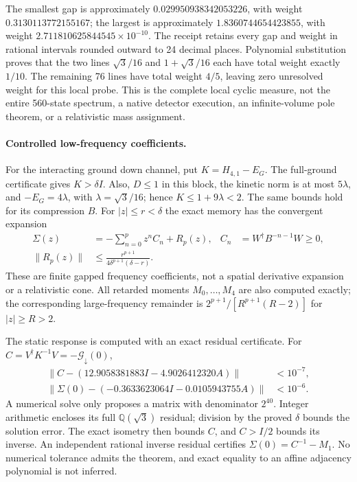 The smallest gap is approximately $0.029950938342053226$, with weight
$0.3130113772155167$; the largest is approximately $1.8360744654423855$,
with weight $2.711810625844545\times10^{-10}$.
The receipt retains every gap and weight in rational intervals rounded
outward to 24 decimal places.  Polynomial substitution proves that the
two lines $\sqrt3/16$ and $1+\sqrt3/16$ each have total weight exactly
$1/10$.  The remaining 76 lines have total weight $4/5$, leaving zero
unresolved weight for this local probe.  This is the complete local cyclic
measure, not the entire 560-state spectrum, a native detector execution,
an infinite-volume pole theorem, or a relativistic mass assignment.

\paragraph{Controlled low-frequency coefficients.}
For the interacting ground down channel, put $K=H_{4,1}-E_G$.
The full-ground certificate gives $K>\delta I$.  Also, $D\leq1$ in
this block, the kinetic norm is at most $5\lambda$, and
$-E_G=4\lambda$, with $\lambda=\sqrt3/16$; hence
$K\leq1+9\lambda<2$.  The same bounds hold for its compression $B$.
For $|z|\leq r<\delta$ the exact memory has the convergent expansion
\begin{align*}
\Sigma(z)&=-\sum_{n=0}^{p}z^n C_n+R_p(z),
 &C_n&=W^\dagger B^{-n-1}W\geq0,\\
\|R_p(z)\|&\leq
 \frac{r^{p+1}}{4\delta^{p+1}(\delta-r)}.
\end{align*}
These are finite gapped frequency coefficients, not a spatial derivative
expansion or a relativistic cone.  All retarded moments $M_0,\ldots,M_4$
are also computed exactly; the corresponding large-frequency remainder is
$2^{p+1}/[R^{p+1}(R-2)]$ for $|z|\geq R>2$.

The static response is computed with an exact residual certificate.
For $C=V^\dagger K^{-1}V=-\mathcal G_\downarrow(0)$,
\begin{align*}
\|C-(12.9058381883I-4.9026412320A)\|&<10^{-7},\\
\|\Sigma(0)-(-0.3633623064I-0.0105943755A)\|&<10^{-6}.
\end{align*}
A numerical solve only proposes a matrix with denominator $2^{40}$.
Integer arithmetic encloses its full $\mathbb Q(\sqrt3)$ residual;
division by the proved $\delta$ bounds the solution error.  The exact
isometry then bounds $C$, and $C>I/2$ bounds its inverse.
An independent rational inverse residual certifies
$\Sigma(0)=C^{-1}-M_1$.  No numerical tolerance admits the theorem, and
exact equality to an affine adjacency polynomial is not inferred.

